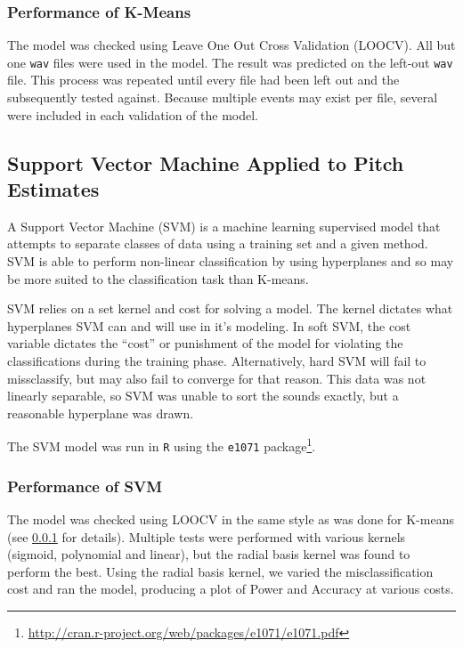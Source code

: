 \documentclass[paper=a4, fontsize=11pt]{scrartcl}
\numberwithin{equation}{section}
\numberwithin{figure}{section}
\numberwithin{table}{section}
\begin{document}

\subsubsection{Performance of K-Means}\label{subsubsec:LOOCV}
The model was checked using Leave One Out Cross Validation (LOOCV). All but one \texttt{wav} files were used in the model. The result was predicted on the left-out \texttt{wav} file. This process was repeated until every file had been left out and the subsequently tested against. Because multiple events may exist per file, several were included in each validation of the model.

\subsection{Support Vector Machine Applied to Pitch Estimates}
A Support Vector Machine (SVM) is a machine learning supervised model that attempts to separate classes of data using a training set and a given method. SVM is able to perform non-linear classification by using hyperplanes and so may be more suited to the classification task than K-means.

\noindent SVM relies on a set kernel and cost for solving a model. The kernel dictates what hyperplanes SVM can and will use in it's modeling. In soft SVM, the cost variable dictates the ``cost'' or punishment of the model for violating the classifications during the training phase. Alternatively, hard SVM will fail to missclassify, but may also fail to converge for that reason. This data was not linearly separable, so SVM was unable to sort the sounds exactly, but a reasonable hyperplane was drawn.

\noindent The SVM model was run in \texttt{R} using the \texttt{e1071} package\footnote{\url{http://cran.r-project.org/web/packages/e1071/e1071.pdf}}.

\subsubsection{Performance of SVM}
The model was checked using LOOCV in the same style as was done for K-means (see \ref{subsubsec:LOOCV} for details). Multiple tests were performed with various kernels (sigmoid, polynomial and linear), but the radial basis kernel was found to perform the best. Using the radial basis kernel, we varied the misclassification cost and ran the model, producing a plot of Power and Accuracy at various costs.
\end{document}
